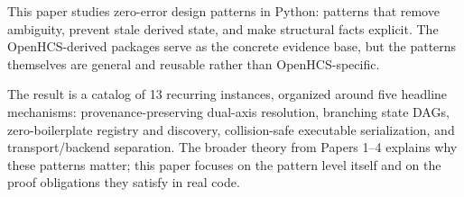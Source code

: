 This paper studies zero-error design patterns in Python: patterns that remove ambiguity, prevent stale derived state, and make structural facts explicit. The OpenHCS-derived packages serve as the concrete evidence base, but the patterns themselves are general and reusable rather than OpenHCS-specific.

The result is a catalog of 13 recurring instances, organized around five headline mechanisms: provenance-preserving dual-axis resolution, branching state DAGs, zero-boilerplate registry and discovery, collision-safe executable serialization, and transport/backend separation. The broader theory from Papers 1--4 explains why these patterns matter; this paper focuses on the pattern level itself and on the proof obligations they satisfy in real code.

